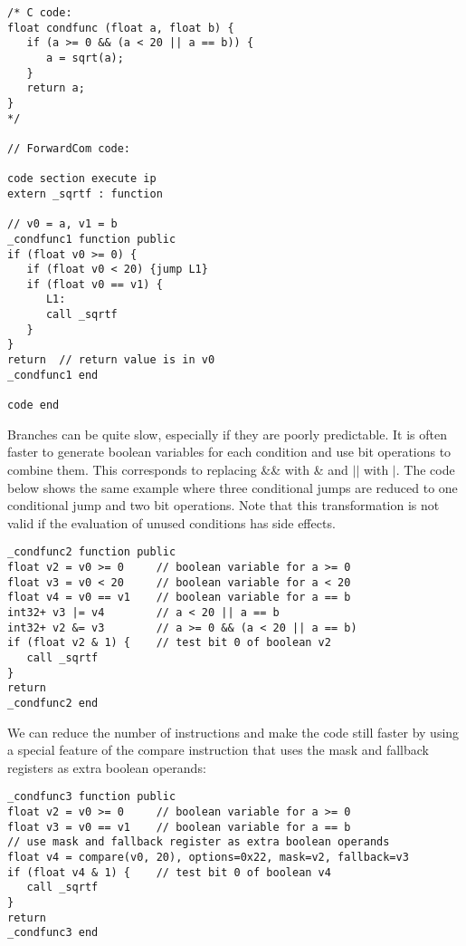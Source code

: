 \documentclass[forwardcom.tex]{subfiles}
\begin{document}
\begin{example}
\label{exampleBooleanOperations1}
\end{example}
\begin{lstlisting}[frame=single]
/* C code:
float condfunc (float a, float b) {
   if (a >= 0 && (a < 20 || a == b)) {
      a = sqrt(a);
   }
   return a;
}
*/

// ForwardCom code:

code section execute ip
extern _sqrtf : function

// v0 = a, v1 = b
_condfunc1 function public
if (float v0 >= 0) {
   if (float v0 < 20) {jump L1}
   if (float v0 == v1) {
      L1:
      call _sqrtf
   }
}
return  // return value is in v0
_condfunc1 end

code end
\end{lstlisting}
\vspace{4mm}

Branches can be quite slow, especially if they are poorly predictable. 
It is often faster to generate boolean variables for each condition and use bit operations to combine them. 
This corresponds to replacing \&\& with \& and $\vert\vert$ with $\vert$. 
The code below shows the same example where three conditional jumps are reduced to one conditional jump and two bit operations.
Note that this transformation is not valid if the evaluation of unused conditions has side effects.

\begin{example}
\label{exampleBooleanOperations2}
\end{example}
\begin{lstlisting}[frame=single]
_condfunc2 function public
float v2 = v0 >= 0     // boolean variable for a >= 0
float v3 = v0 < 20     // boolean variable for a < 20
float v4 = v0 == v1    // boolean variable for a == b
int32+ v3 |= v4        // a < 20 || a == b
int32+ v2 &= v3        // a >= 0 && (a < 20 || a == b)
if (float v2 & 1) {    // test bit 0 of boolean v2
   call _sqrtf
}
return
_condfunc2 end
\end{lstlisting}
\vspace{4mm}

We can reduce the number of instructions and make the code still faster by using a special feature of the compare instruction that uses the mask and fallback registers as extra boolean operands:

\begin{example}
\label{exampleBooleanOperations3}
\end{example}
\begin{lstlisting}[frame=single]
_condfunc3 function public
float v2 = v0 >= 0     // boolean variable for a >= 0
float v3 = v0 == v1    // boolean variable for a == b
// use mask and fallback register as extra boolean operands
float v4 = compare(v0, 20), options=0x22, mask=v2, fallback=v3
if (float v4 & 1) {    // test bit 0 of boolean v4
   call _sqrtf
}
return
_condfunc3 end
\end{lstlisting}
\vspace{4mm}
\end{document}
